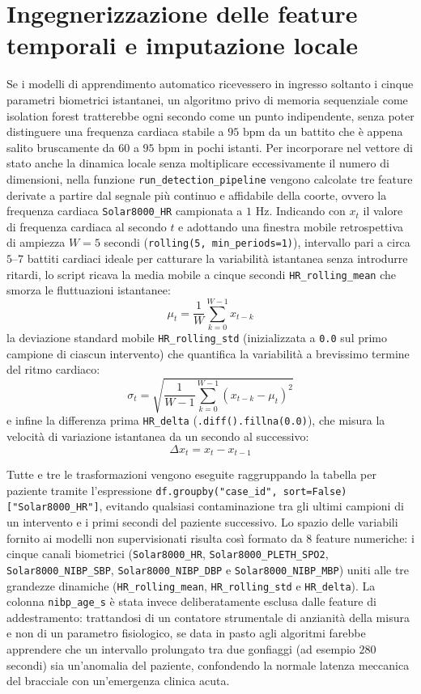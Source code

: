 \section{Ingegnerizzazione delle feature temporali e imputazione locale}
Se i modelli di apprendimento automatico ricevessero in ingresso soltanto i cinque parametri biometrici istantanei, un algoritmo privo di memoria sequenziale come isolation forest tratterebbe ogni secondo come un punto indipendente, senza poter distinguere una frequenza cardiaca stabile a $95\text{ bpm}$ da un battito che \`e appena salito bruscamente da $60$ a $95\text{ bpm}$ in pochi istanti. Per incorporare nel vettore di stato anche la dinamica locale senza moltiplicare eccessivamente il numero di dimensioni, nella funzione \texttt{run\_detection\_pipeline} vengono calcolate tre feature derivate a partire dal segnale pi\`u continuo e affidabile della coorte, ovvero la frequenza cardiaca \texttt{Solar8000\_HR} campionata a $1\text{ Hz}$. Indicando con $x_t$ il valore di frequenza cardiaca al secondo $t$ e adottando una finestra mobile retrospettiva di ampiezza $W = 5$ secondi (\texttt{rolling(5, min\_periods=1)}), intervallo pari a circa $5\text{--}7$ battiti cardiaci ideale per catturare la variabilit\`a istantanea senza introdurre ritardi, lo script ricava la media mobile a cinque secondi \texttt{HR\_rolling\_mean} che smorza le fluttuazioni istantanee:
$$\mu_t = \frac{1}{W} \sum_{k=0}^{W-1} x_{t-k}$$
la deviazione standard mobile \texttt{HR\_rolling\_std} (inizializzata a \texttt{0.0} sul primo campione di ciascun intervento) che quantifica la variabilit\`a a brevissimo termine del ritmo cardiaco:
$$\sigma_t = \sqrt{\frac{1}{W-1} \sum_{k=0}^{W-1} (x_{t-k} - \mu_t)^2}$$
e infine la differenza prima \texttt{HR\_delta} (\texttt{.diff().fillna(0.0)}), che misura la velocit\`a di variazione istantanea da un secondo al successivo:
$$\Delta x_t = x_t - x_{t-1}$$

Tutte e tre le trasformazioni vengono eseguite raggruppando la tabella per paziente tramite l'espressione \texttt{df.groupby("case\_id", sort=False)["Solar8000\_HR"]}, evitando qualsiasi contaminazione tra gli ultimi campioni di un intervento e i primi secondi del paziente successivo. Lo spazio delle variabili fornito ai modelli non supervisionati risulta cos\`i formato da 8 feature numeriche: i cinque canali biometrici (\texttt{Solar8000\_HR}, \texttt{Solar8000\_PLETH\_SPO2}, \texttt{Solar8000\_NIBP\_SBP}, \texttt{Solar8000\_NIBP\_DBP} e \texttt{Solar8000\_NIBP\_MBP}) uniti alle tre grandezze dinamiche (\texttt{HR\_rolling\_mean}, \texttt{HR\_rolling\_std} e \texttt{HR\_delta}). La colonna \texttt{nibp\_age\_s} \`e stata invece deliberatamente esclusa dalle feature di addestramento: trattandosi di un contatore strumentale di anzianit\`a della misura e non di un parametro fisiologico, se data in pasto agli algoritmi farebbe apprendere che un intervallo prolungato tra due gonfiaggi (ad esempio $280$ secondi) sia un'anomalia del paziente, confondendo la normale latenza meccanica del bracciale con un'emergenza clinica acuta.

